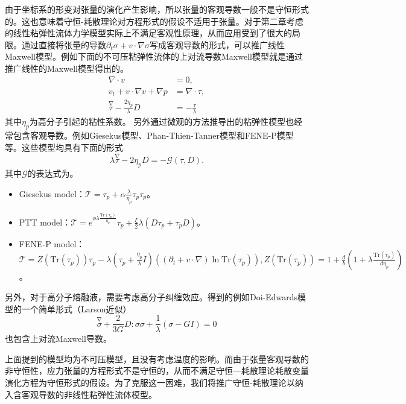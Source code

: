 由于坐标系的形变对张量的演化产生影响，所以张量的客观导数一般不是守恒形式的。这也意味着守恒-耗散理论对方程形式的假设不适用于张量。对于第二章考虑的线性粘弹性流体力学模型实际上不满足客观性原理，从而应用受到了很大的局限。通过直接将张量的导数$\partial_t \sigma  + v \cdot \nabla \sigma$写成客观导数的形式，可以推广线性Maxwell模型。例如下面的不可压粘弹性流体的上对流导数Maxwell模型就是通过推广线性的Maxwell模型得出的\cite{oldroyd1950formulation}。
\begin{subequations} \label{eq:UCM}
	\begin{align}
		\nabla \cdot v &= 0, \\
		v_t + v \cdot \nabla v + \nabla p  &= \nabla \cdot \tau, \\
		\stackrel{\nabla} \tau - \frac{2\eta_p}{\lambda} D &= - \frac{\tau}{\lambda}
	\end{align}
\end{subequations}
其中$\eta_p$为高分子引起的粘性系数。
另外通过微观的方法推导出的粘弹性模型也经常包含客观导数。例如Giesekus模型、Phan-Thien-Tanner模型和FENE-P模型等。这些模型均具有下面的形式
\begin{equation*}
	\lambda \stackrel{\nabla} \tau  -2 \eta_p D = - \mathcal{G}(\tau,D).
\end{equation*}
其中$\mathcal{G}$的表达式为\cite{le2009multiscale}。
\begin{itemize}
\item Giesekus model：$\mathcal{T} = \tau_p + \alpha \frac{\lambda}{\eta_p} \tau_p\tau_p$。
\item PTT model：$\mathcal{T} = e^{\phi \lambda \frac{\mbox{Tr}(\tau_p)}{\eta_p}}\tau_p + \frac{\xi}{2} \lambda (D \tau_p + \tau_p D)$。
\item FENE-P model：$\mathcal{T}  = Z(\mbox{Tr}(\tau_p))\tau_p  -\lambda (\tau_p + \frac{\eta_p}{\lambda} I)\left( (\partial_t + v \cdot \nabla) \ln \mbox{Tr}(\tau_p) \right), Z(\mbox{Tr}(\tau_p)) = 1 + \frac{d}{b} (1+ \lambda \frac{\mbox{Tr}{(\tau_p)}}{d \eta_p})$。
\end{itemize}
另外，对于高分子熔融液，需要考虑高分子纠缠效应。得到的例如Doi-Edwards模型的一个简单形式（Larson近似）
\begin{equation}
	\stackrel{\nabla} \sigma + \frac{2}{3G} D:\sigma \sigma + \frac{1}{\lambda}(\sigma - G I) = 0
\end{equation}
也包含上对流Maxwell导数\cite{larson2015modeling}。

上面提到的模型均为不可压模型，且没有考虑温度的影响。而由于张量客观导数的非守恒性，应力张量的方程形式不是守恒的，从而不满足守恒—耗散理论耗散变量演化方程为守恒形式的假设。为了克服这一困难，我们将推广守恒-耗散理论以纳入含客观导数的非线性粘弹性流体模型。


